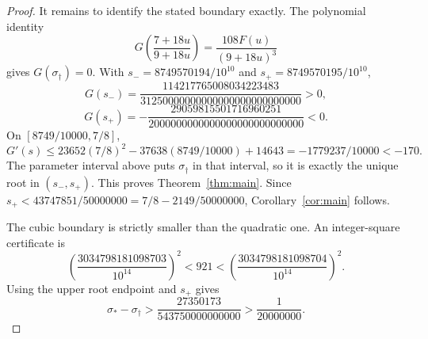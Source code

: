 \begin{proof}
It remains to identify the stated boundary exactly. The polynomial identity
\begin{equation}\label{eq:elimination}
 G\!\left(\frac{7+18u}{9+18u}\right)=\frac{108F(u)}{(9+18u)^3}
\end{equation}
gives $G(\sigma_\dagger)=0$. With $s_-=8749570194/10^{10}$ and $s_+=8749570195/10^{10}$,
\[
 G(s_-)=\frac{114217765008034223483}{31250000000000000000000000000}>0,
\]
\[
 G(s_+)=-\frac{29059815501716960251}{2000000000000000000000000000}<0.
\]
On $[8749/10000,7/8]$,
\[
 G'(s)\le23652(7/8)^2-37638(8749/10000)+14643
        =-1779237/10000<-170.
\]
The parameter interval above puts $\sigma_\dagger$ in that interval, so it is exactly the unique root in $(s_-,s_+)$. This proves Theorem~\ref{thm:main}.
Since $s_+<43747851/50000000=7/8-2149/50000000$, Corollary~\ref{cor:main} follows.

The cubic boundary is strictly smaller than the quadratic one. An integer-square certificate is
\[
 \left(\frac{3034798181098703}{10^{14}}\right)^2<921<
 \left(\frac{3034798181098704}{10^{14}}\right)^2.
\]
Using the upper root endpoint and $s_+$ gives
\[
 \sigma_*-\sigma_\dagger>
 \frac{27350173}{543750000000000}>\frac1{20000000}.
\]
\end{proof}
